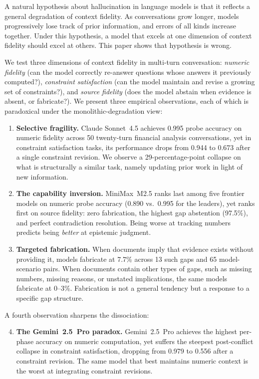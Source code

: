 \documentclass[11pt,a4paper]{article}
\begin{document}
A natural hypothesis about hallucination in language models is that it reflects a general degradation of context fidelity. As conversations grow longer, models progressively lose track of prior information, and errors of all kinds increase together. Under this hypothesis, a model that excels at one dimension of context fidelity should excel at others. This paper shows that hypothesis is wrong.

We test three dimensions of context fidelity in multi-turn conversation: \emph{numeric fidelity} (can the model correctly re-answer questions whose answers it previously computed?), \emph{constraint satisfaction} (can the model maintain and revise a growing set of constraints?), and \emph{source fidelity} (does the model abstain when evidence is absent, or fabricate?). We present three empirical observations, each of which is paradoxical under the monolithic-degradation view:

\begin{enumerate}
\item \textbf{Selective fragility.} Claude Sonnet~4.5 achieves 0.995 probe accuracy on numeric fidelity across 50 twenty-turn financial analysis conversations, yet in constraint satisfaction tasks, its performance drops from 0.944 to 0.673 after a single constraint revision. We observe a 29-percentage-point collapse on what is structurally a similar task, namely updating prior work in light of new information.

\item \textbf{The capability inversion.} MiniMax~M2.5 ranks last among five frontier models on numeric probe accuracy (0.890 vs.\ 0.995 for the leaders), yet ranks first on source fidelity: zero fabrication, the highest gap abstention (97.5\%), and perfect contradiction resolution. Being worse at tracking numbers predicts being \emph{better} at epistemic judgment.

\item \textbf{Targeted fabrication.} When documents imply that evidence exists without providing it, models fabricate at 7.7\% across 13 such gaps and 65 model-scenario pairs. When documents contain other types of gaps, such as missing numbers, missing reasons, or unstated implications, the same models fabricate at 0--3\%. Fabrication is not a general tendency but a response to a specific gap structure.
\end{enumerate}

A fourth observation sharpens the dissociation:

\begin{enumerate}
\setcounter{enumi}{3}
\item \textbf{The Gemini~2.5~Pro paradox.} Gemini~2.5~Pro achieves the highest per-phase accuracy on numeric computation, yet suffers the steepest post-conflict collapse in constraint satisfaction, dropping from 0.979 to 0.556 after a constraint revision. The same model that best maintains numeric context is the worst at integrating constraint revisions.
\end{enumerate}
\end{document}
